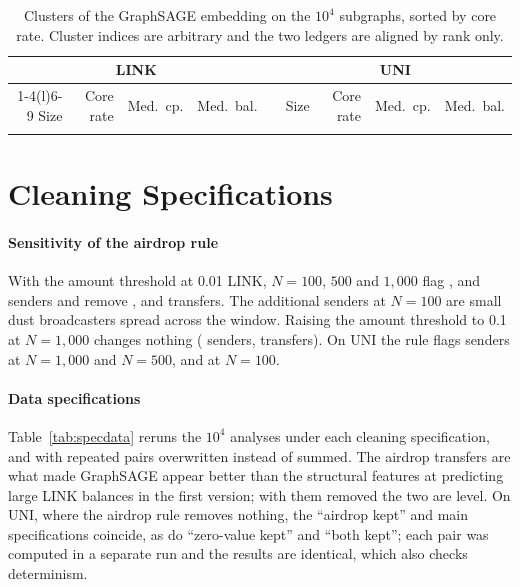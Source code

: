 \begin{table}[t]
\centering\footnotesize
\caption{Clusters of the GraphSAGE embedding on the $10^{4}$ subgraphs, sorted
by core rate. Cluster indices are arbitrary and the two ledgers are aligned by
rank only.}
\label{tab:typology}
\setlength{\tabcolsep}{4.5pt}
\begin{tabular}{@{}rrrr c rrrr@{}}
\toprule
\multicolumn{4}{c}{LINK} & & \multicolumn{4}{c}{UNI} \\
\cmidrule(r){1-4}\cmidrule(l){6-9}
Size & Core rate & Med.\ cp. & Med.\ bal. & & Size & Core rate & Med.\ cp. & Med.\ bal. \\
\midrule
\V{tab.typology}
\bottomrule
\end{tabular}
\end{table}

\section{Cleaning Specifications}
\label{app:cleaning}

\paragraph{Sensitivity of the airdrop rule}
With the amount threshold at 0.01 LINK, $N = 100$, $500$ and $1{,}000$ flag
,  and
 senders and remove ,
 and  transfers. The additional
senders at $N=100$ are small dust broadcasters spread across the window.
Raising the amount threshold to 0.1 at $N = 1{,}000$ changes nothing
( senders,  transfers).
On UNI the rule flags  senders at $N = 1{,}000$
and $N = 500$, and  at $N=100$.

\paragraph{Data specifications}
Table~\ref{tab:specdata} reruns the $10^{4}$ analyses under each cleaning
specification, and with repeated pairs overwritten instead of summed. The
airdrop transfers are what made GraphSAGE appear better than the structural
features at predicting large LINK balances in the first version; with them
removed the two are level. On UNI, where the airdrop rule removes nothing,
the ``airdrop kept'' and main specifications coincide, as do ``zero-value
kept'' and ``both kept''; each pair was computed in a separate run and the
results are identical, which also checks determinism.

